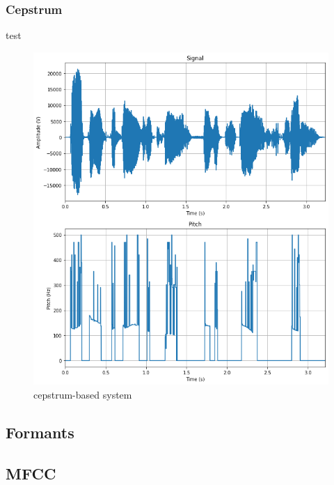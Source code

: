 \documentclass[]{article}
\begin{document}
\subsubsection{Cepstrum}
test

\begin{figure}[h]
    \centering
    \includegraphics[scale=0.5]{images/cepstrum_pitch.png}
    \caption{\label{cepstrum}cepstrum-based system}
\end{figure}

\subsection{Formants}


\subsection{MFCC}




\end{document}
